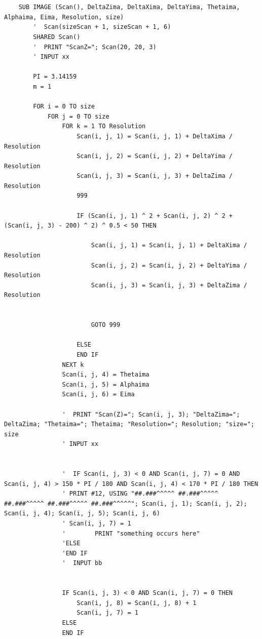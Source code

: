 \documentclass[10pt, reqno]{exam}
\begin{document}
\begin{verbatim}
    
    
    SUB IMAGE (Scan(), DeltaZima, DeltaXima, DeltaYima, Thetaima, Alphaima, Eima, Resolution, size)
        '  Scan(sizeScan + 1, sizeScan + 1, 6)
        SHARED Scan()
        '  PRINT "ScanZ="; Scan(20, 20, 3)
        ' INPUT xx
    
        PI = 3.14159
        m = 1
    
        FOR i = 0 TO size
            FOR j = 0 TO size
                FOR k = 1 TO Resolution
                    Scan(i, j, 1) = Scan(i, j, 1) + DeltaXima / Resolution
                    Scan(i, j, 2) = Scan(i, j, 2) + DeltaYima / Resolution
                    Scan(i, j, 3) = Scan(i, j, 3) + DeltaZima / Resolution
                    999
    
                    IF (Scan(i, j, 1) ^ 2 + Scan(i, j, 2) ^ 2 + (Scan(i, j, 3) - 200) ^ 2) ^ 0.5 < 50 THEN
    
                        Scan(i, j, 1) = Scan(i, j, 1) + DeltaXima / Resolution
                        Scan(i, j, 2) = Scan(i, j, 2) + DeltaYima / Resolution
                        Scan(i, j, 3) = Scan(i, j, 3) + DeltaZima / Resolution
    
    
                        GOTO 999
    
                    ELSE
                    END IF
                NEXT k
                Scan(i, j, 4) = Thetaima
                Scan(i, j, 5) = Alphaima
                Scan(i, j, 6) = Eima
    
                '  PRINT "Scan(Z)="; Scan(i, j, 3); "DeltaZima="; DeltaZima; "Thetaima="; Thetaima; "Resolution="; Resolution; "size="; size
                ' INPUT xx
    
    
                '  IF Scan(i, j, 3) < 0 AND Scan(i, j, 7) = 0 AND Scan(i, j, 4) > 150 * PI / 180 AND Scan(i, j, 4) < 170 * PI / 180 THEN
                ' PRINT #12, USING "##.###^^^^^ ##.###^^^^^ ##.###^^^^^ ##.###^^^^^ ##.###^^^^^"; Scan(i, j, 1); Scan(i, j, 2); Scan(i, j, 4); Scan(i, j, 5); Scan(i, j, 6)
                ' Scan(i, j, 7) = 1
                '        PRINT "something occurs here"
                'ELSE
                'END IF
                '  INPUT bb
    
    
                IF Scan(i, j, 3) < 0 AND Scan(i, j, 7) = 0 THEN
                    Scan(i, j, 8) = Scan(i, j, 8) + 1
                    Scan(i, j, 7) = 1
                ELSE
                END IF
    

\end{verbatim}
\end{document}
